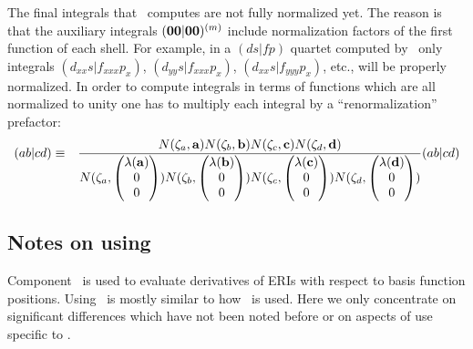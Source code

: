 \documentclass[12pt]{article}
\begin{document}
The final integrals that \LIBINT\ computes are not fully normalized yet. The reason is that the auxiliary
integrals $({\bf 00}|{\bf 00})^{(m)}$ include normalization factors of the first function of each shell.
For example, in a $(ds|fp)$ quartet computed by \LIBINT\ only integrals $(d_{xx} s|f_{xxx} p_x)$,
$(d_{yy} s|f_{xxx} p_x)$, $(d_{xx} s|f_{yyy} p_x)$, etc.,
will be properly normalized. In order to compute integrals in terms of functions which are all normalized to unity
one has to multiply each integral by a ``renormalization'' prefactor:
\begin{eqnarray}
(ab|cd) & \equiv & \frac{N(\zeta_a,{\bf a}) N(\zeta_b,{\bf b}) N(\zeta_c,{\bf c}) N(\zeta_d,{\bf d})}
{N(\zeta_a, \begin{pmatrix}\lambda({\bf a}) \\ 0 \\ 0 \end{pmatrix}) N(\zeta_b, \begin{pmatrix}\lambda({\bf b}) \\ 0 \\ 0 \end{pmatrix})
N(\zeta_c, \begin{pmatrix}\lambda({\bf c}) \\ 0 \\ 0 \end{pmatrix}) N(\zeta_d, \begin{pmatrix}\lambda({\bf d}) \\ 0 \\ 0 \end{pmatrix})}
(ab|cd)
\end{eqnarray}

\subsection{Notes on using \libderiv}
Component \libderiv\ is used to evaluate derivatives of ERIs with respect to basis function positions.
Using \libderiv\ is mostly similar to how \libint\ is used. Here we only concentrate on significant
differences which have not been noted before or on aspects of use specific to \libderiv .
\end{document}
